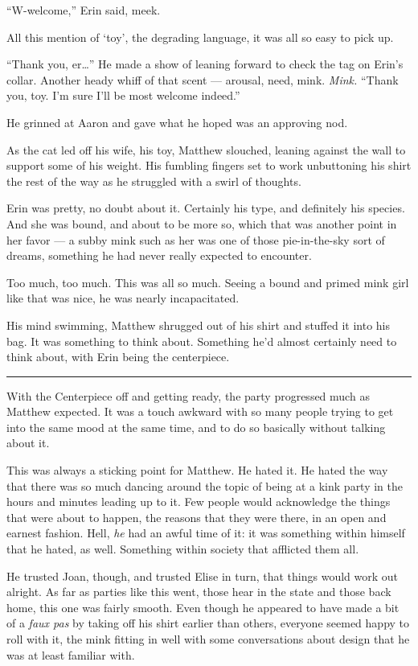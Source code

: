 ``W-welcome,'' Erin said, meek.

All this mention of `toy', the degrading language, it was all so easy to pick up.

``Thank you, er\ldots{}'' He made a show of leaning forward to check the tag on Erin's collar. Another heady whiff of that scent --- arousal, need, mink. \emph{Mink.} ``Thank you, toy. I'm sure I'll be most welcome indeed.''

He grinned at Aaron and gave what he hoped was an approving nod.

As the cat led off his wife, his toy, Matthew slouched, leaning against the wall to support some of his weight. His fumbling fingers set to work unbuttoning his shirt the rest of the way as he struggled with a swirl of thoughts.

Erin was pretty, no doubt about it. Certainly his type, and definitely his species. And she was bound, and about to be more so, which that was another point in her favor --- a subby mink such as her was one of those pie-in-the-sky sort of dreams, something he had never really expected to encounter.

Too much, too much. This was all so much. Seeing a bound and primed mink girl like that was nice, he was nearly incapacitated.

His mind swimming, Matthew shrugged out of his shirt and stuffed it into his bag. It was something to think about. Something he'd almost certainly need to think about, with Erin being the centerpiece.

\begin{center}\rule{0.5\linewidth}{\linethickness}\end{center}

With the Centerpiece off and getting ready, the party progressed much as Matthew expected. It was a touch awkward with so many people trying to get into the same mood at the same time, and to do so basically without talking about it.

This was always a sticking point for Matthew. He hated it. He hated the way that there was so much dancing around the topic of being at a kink party in the hours and minutes leading up to it. Few people would acknowledge the things that were about to happen, the reasons that they were there, in an open and earnest fashion. Hell, \emph{he} had an awful time of it: it was something within himself that he hated, as well. Something within society that afflicted them all.

He trusted Joan, though, and trusted Elise in turn, that things would work out alright. As far as parties like this went, those hear in the state and those back home, this one was fairly smooth. Even though he appeared to have made a bit of a \emph{faux pas} by taking off his shirt earlier than others, everyone seemed happy to roll with it, the mink fitting in well with some conversations about design that he was at least familiar with.

